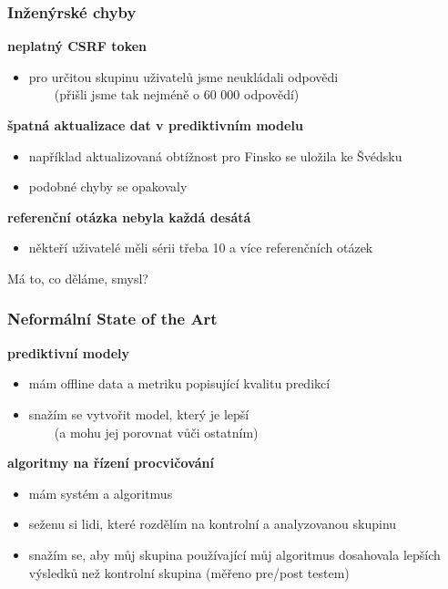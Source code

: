 \documentclass[xcolor=svgnames]{beamer}
\begin{document}
\begin{frame}
	\frametitle{Inženýrské chyby}
	\textbf{neplatný CSRF token}
		\begin{itemize}
			\item pro určitou skupinu uživatelů jsme neukládali odpovědi\\
				~~~~(přišli jsme tak nejméně o 60 000 odpovědí)
		\end{itemize}
	\pause
	\textbf{špatná aktualizace dat v prediktivním modelu}
		\begin{itemize}
			\item například aktualizovaná obtížnost pro Finsko se uložila ke Švédsku
			\item podobné chyby se opakovaly
		\end{itemize}
	\pause
	\textbf{referenční otázka nebyla každá desátá}
		\begin{itemize}
			\item někteří uživatelé měli sérii třeba 10 a více referenčních otázek
		\end{itemize}
\end{frame}
\begin{frame}[plain]
	\begin{center}
		{\Huge Má to, co děláme, smysl?}
	\end{center}
\end{frame}
\begin{frame}
	\frametitle{Neformální State of the Art}
	\textbf{prediktivní modely}
		\begin{itemize}
			\item mám offline data a metriku popisující kvalitu predikcí
			\item snažím se vytvořit model, který je lepší\\~~~~(a mohu jej porovnat vůči ostatním)
		\end{itemize}
	\textbf{algoritmy na řízení procvičování}
		\begin{itemize}
			\item mám systém a algoritmus
			\item seženu si lidi, které rozdělím na kontrolní a analyzovanou skupinu
			\item snažím se, aby můj skupina používající můj algoritmus dosahovala
				lepších výsledků než kontrolní skupina (měřeno pre/post testem)
		\end{itemize}
\end{frame}
\end{document}
